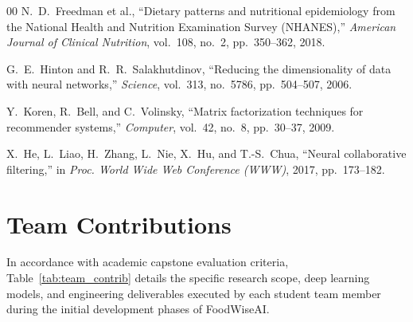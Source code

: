 \documentclass[10pt,journal,compsoc]{IEEEtran}
\begin{document}
\begin{thebibliography}{00}
N.~D.~Freedman et al., ``Dietary patterns and nutritional epidemiology from the National Health and Nutrition Examination Survey (NHANES),'' \emph{American Journal of Clinical Nutrition}, vol.~108, no.~2, pp.~350--362, 2018.

G.~E.~Hinton and R.~R.~Salakhutdinov, ``Reducing the dimensionality of data with neural networks,'' \emph{Science}, vol.~313, no.~5786, pp.~504--507, 2006.

Y.~Koren, R.~Bell, and C.~Volinsky, ``Matrix factorization techniques for recommender systems,'' \emph{Computer}, vol.~42, no.~8, pp.~30--37, 2009.

X.~He, L.~Liao, H.~Zhang, L.~Nie, X.~Hu, and T.-S.~Chua, ``Neural collaborative filtering,'' in \emph{Proc. World Wide Web Conference (WWW)}, 2017, pp.~173--182.

\end{thebibliography}

\section*{Team Contributions}
In accordance with academic capstone evaluation criteria, Table~\ref{tab:team_contrib} details the specific research scope, deep learning models, and engineering deliverables executed by each student team member during the initial development phases of FoodWiseAI.
\end{document}
